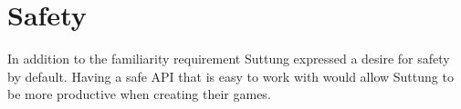 \section{Safety}
In addition to the familiarity requirement Suttung expressed a desire for safety by default.
Having a safe API that is easy to work with would allow Suttung to be more productive
when creating their games.
